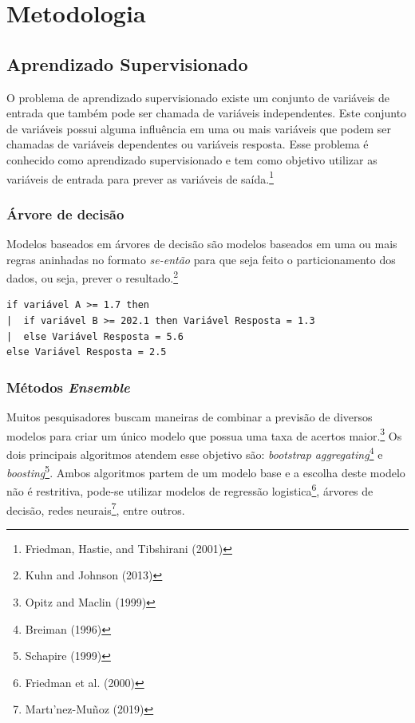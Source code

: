\documentclass[
	12pt,				%
	a4paper,		%
	oneside,    %
	chapter=TITLE,		   %
	section=TITLE,		   %
	subsection=TITLE,	   %
	subsubsection=TITLE, %
	english,			%
	french,				%
	spanish,			%
	brazil,				%
]{abntex2}
\begin{document}
\hypertarget{metodologia}{%
\chapter{Metodologia}\label{metodologia}}

\hypertarget{aprendizado-supervisionado}{%
\section{Aprendizado Supervisionado}\label{aprendizado-supervisionado}}

O problema de aprendizado supervisionado existe um conjunto de variáveis
de entrada que também pode ser chamada de variáveis independentes. Este
conjunto de variáveis possui alguma influência em uma ou mais variáveis
que podem ser chamadas de variáveis dependentes ou variáveis resposta.
Esse problema é conhecido como aprendizado supervisionado e tem como
objetivo utilizar as variáveis de entrada para prever as variáveis de
saída.\footnote{Friedman, Hastie, and Tibshirani (2001)}

\hypertarget{uxe1rvore-de-decisuxe3o}{%
\subsection{Árvore de decisão}\label{uxe1rvore-de-decisuxe3o}}

Modelos baseados em árvores de decisão são modelos baseados em uma ou
mais regras aninhadas no formato \emph{se-então} para que seja feito o
particionamento dos dados, ou seja, prever o resultado.\footnote{Kuhn
  and Johnson (2013)}

\begin{verbatim}
if variável A >= 1.7 then
|  if variável B >= 202.1 then Variável Resposta = 1.3
|  else Variável Resposta = 5.6
else Variável Resposta = 2.5
\end{verbatim}

\hypertarget{muxe9todos-ensemble}{%
\subsection{\texorpdfstring{Métodos
\emph{Ensemble}}{Métodos Ensemble}}\label{muxe9todos-ensemble}}

Muitos pesquisadores buscam maneiras de combinar a previsão de diversos
modelos para criar um único modelo que possua uma taxa de acertos
maior.\footnote{Opitz and Maclin (1999)} Os dois principais algoritmos
atendem esse objetivo são: \emph{bootstrap aggregating}\footnote{Breiman
  (1996)} e \emph{boosting}\footnote{Schapire (1999)}. Ambos algoritmos
partem de um modelo base e a escolha deste modelo não é restritiva,
pode-se utilizar modelos de regressão logistica\footnote{Friedman et al.
  (2000)}, árvores de decisão, redes neurais\footnote{Martı'nez-Muñoz
  (2019)}, entre outros.
\end{document}
